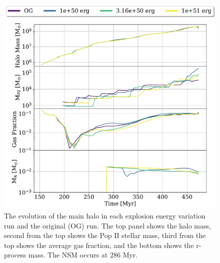 \documentclass[fleqn,usenatbib]{mnras}
\begin{document}
\begin{figure} 
	\includegraphics[width=\columnwidth]{plots/eng_evolution.pdf}
	\caption[The halo mass, Pop II stellar mass, gas fraction, and r-process mass as a function of time for the explosion energy variation runs.]{The evolution of the main halo in each explosion energy variation run and the original (OG) run. The top panel shows the halo mass, second from the top shows the Pop II stellar mass, third from the top shows the average gas fraction, and the bottom shows the r-process mass. The NSM occurs at 286 Myr.}
	\label{fig:eng_evol}
\end{figure}
\end{document}
